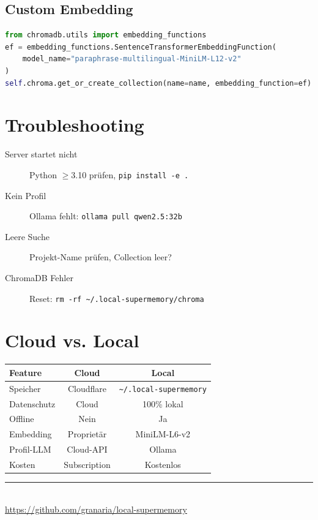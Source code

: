 \documentclass[11pt,a4paper]{article}
\begin{document}
\subsection{Custom Embedding}

\begin{lstlisting}[style=code,language=Python]
from chromadb.utils import embedding_functions
ef = embedding_functions.SentenceTransformerEmbeddingFunction(
    model_name="paraphrase-multilingual-MiniLM-L12-v2"
)
self.chroma.get_or_create_collection(name=name, embedding_function=ef)
\end{lstlisting}


\section{Troubleshooting}

\begin{description}
    \item[Server startet nicht] Python $\geq$3.10 prüfen, \texttt{pip install -e .}
    \item[Kein Profil] Ollama fehlt: \texttt{ollama pull qwen2.5:32b}
    \item[Leere Suche] Projekt-Name prüfen, Collection leer?
    \item[ChromaDB Fehler] Reset: \texttt{rm -rf \textasciitilde/.local-supermemory/chroma}
\end{description}

\section{Cloud vs. Local}

\begin{tabular}{lcc}
\toprule
\textbf{Feature} & \textbf{Cloud} & \textbf{Local} \\
\midrule
Speicher & Cloudflare & \texttt{\textasciitilde/.local-supermemory} \\
Datenschutz & Cloud & 100\% lokal \\
Offline & Nein & Ja \\
Embedding & Proprietär & MiniLM-L6-v2 \\
Profil-LLM & Cloud-API & Ollama \\
Kosten & Subscription & Kostenlos \\
\bottomrule
\end{tabular}

\vfill
\begin{center}
\rule{0.5\textwidth}{0.4pt}\\[1em]
\url{https://github.com/granaria/local-supermemory}
\end{center}
\end{document}
